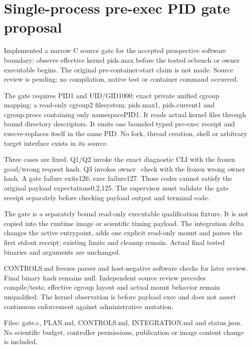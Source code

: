 \documentclass[11pt]{article}
\begin{document}
\section*{Single-process pre-exec PID gate proposal}
Implemented a narrow C source gate for the accepted prospective software boundary: observe effective kernel pids.max before the tested ecbench or owner executable begins. The original pre-container-start claim is not made. Source review is pending; no compilation, native test or container command occurred.

The gate requires PID1 and UID/GID1000; exact private unified cgroup mapping; a read-only cgroup2 filesystem; pids.max1, pids.current1 and cgroup.procs containing only namespacePID1. It reads actual kernel files through bound directory descriptors. It emits one bounded typed pre-exec receipt and execve-replaces itself in the same PID. No fork, thread creation, shell or arbitrary target interface exists in its source.

Three cases are fixed. Q1/Q2 invoke the exact diagnostic CLI with the frozen good/wrong request hash. Q3 invokes owner --check with the frozen wrong owner hash. A gate failure exits126; exec failure127. Those codes cannot satisfy the original payload expectations0,2,125. The supervisor must validate the gate receipt separately before checking payload output and terminal code.

The gate is a separately bound read-only executable qualification fixture. It is not copied into the runtime image or scientific timing payload. The integration delta changes the active entrypoint, adds one explicit read-only mount and parses the first stdout receipt; existing limits and cleanup remain. Actual final tested binaries and arguments are unchanged.

CONTROLS.md freezes parser and host-negative software checks for later review. Final binary hash remains null. Independent source review precedes compile/tests; effective cgroup layout and actual mount behavior remain unqualified. The kernel observation is before payload exec and does not assert continuous enforcement against administrative mutation.

Files: gate.c, PLAN.md, CONTROLS.md, INTEGRATION.md and status.json. No scientific budget, controller permissions, publication or image content change is included.
\end{document}
